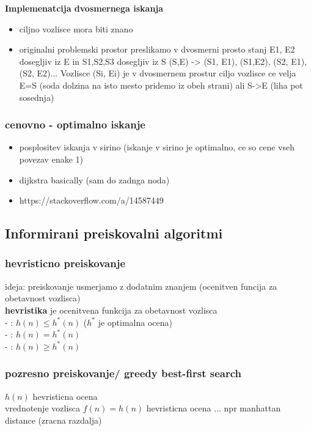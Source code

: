 \textbf{Implemenatcija dvosmernega iskanja}

\begin{itemize}[noitemsep,topsep=0pt,leftmargin=*]
    \item ciljno vozlisce mora biti znano
    \item originalni problemski prostor preslikamo v dvosmerni prosto stanj
    E1, E2 dosegljiv iz E in S1,S2,S3 dosegljiv iz S
    (S,E) -> {(S1, E1), (S1,E2), (S2, E1), (S2, E2)...}
    Vozlisce (Si, Ei) je v dvosmernem prostur ciljo vozlisce ce velja E=S (soda dolzina na isto mesto pridemo iz obeh strani) ali S->E (liha pot sosednja)
\end{itemize}

\subsubsection{cenovno - optimalno iskanje}
\begin{itemize}[noitemsep,leftmargin=*,topsep=0pt]
    \item posplositev iskanja v sirino (iskanje v sirino je optimalno, ce so cene vseh povezav enake 1)\\
    \item dijkstra basically (sam do zadnga noda)
    \item https://stackoverflow.com/a/14587449
\end{itemize}


\subsection{Informirani preiskovalni algoritmi}

\subsubsection{hevristicno preiskovanje}
ideja: preiskovanje usmerjamo z dodatnim znanjem (ocenitven funcija za obetavnost vozlisca)\\
\textbf{hevristika} je ocenitvena funkcija za obetavnost vozlisca\\
- : $h(n) \leq h^*(n)$ ($h^*$ je optimalna ocena)\\
- : $h(n) = h^*(n)$\\
- : $h(n) \geq h^*(n)$\\


\subsubsection{pozresno preiskovanje/ greedy best-first search}
$h(n)$ hevristicna ocena\\
vrednotenje vozlisca $f(n)=h(n)$
hevristicna ocena ... npr manhattan distance (zracna razdalja)

